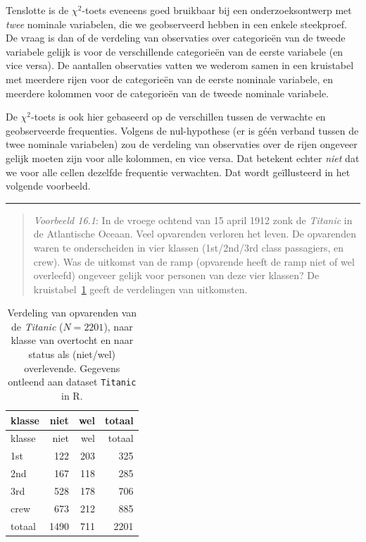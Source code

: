 \documentclass[
]{book}
\begin{document}
Tenslotte is de \(\chi^2\)-toets eveneens goed bruikbaar bij een onderzoeksontwerp met
\emph{twee} nominale variabelen, die we geobserveerd hebben in een enkele
steekproef. De vraag is dan of de verdeling van observaties over
categorieën van de tweede variabele gelijk is voor de verschillende
categorieën van de eerste variabele (en vice versa). De aantallen
observaties vatten we wederom samen in een kruistabel met meerdere rijen
voor de categorieën van de eerste nominale variabele, en meerdere
kolommen voor de categorieën van de tweede nominale variabele.

De \(\chi^2\)-toets is ook hier gebaseerd op de verschillen tussen de verwachte en
geobserveerde frequenties. Volgens de nul-hypothese (er is géén verband
tussen de twee nominale variabelen) zou de verdeling van observaties
over de rijen ongeveer gelijk moeten zijn voor alle kolommen, en vice
versa. Dat betekent echter \emph{niet} dat we voor alle cellen dezelfde
frequentie verwachten. Dat wordt geïllusteerd in het volgende voorbeeld.

\begin{center}\rule{0.5\linewidth}{0.5pt}\end{center}

\begin{quote}
\emph{Voorbeeld 16.1}: In de vroege ochtend
van 15 april 1912 zonk de \emph{Titanic} in de Atlantische Oceaan. Veel
opvarenden verloren het leven. De opvarenden waren te onderscheiden in
vier klassen (1st/2nd/3rd class passagiers, en crew). Was de uitkomst
van de ramp (opvarende heeft de ramp niet of wel overleefd) ongeveer gelijk voor personen van
deze vier klassen? De kruistabel~\ref{tab:titanic} geeft de verdelingen van uitkomsten.
\end{quote}

\begin{longtable}[]{@{}lrrr@{}}
\caption{\label{tab:titanic} Verdeling van opvarenden van de \emph{Titanic} (\(N=2201\)), naar klasse van overtocht en naar status als (niet/wel) overlevende. Gegevens ontleend aan dataset \texttt{Titanic} in R.}\tabularnewline
\toprule\noalign{}
klasse & niet & wel & totaal \\
\midrule\noalign{}
\endfirsthead
\toprule\noalign{}
klasse & niet & wel & totaal \\
\midrule\noalign{}
\endhead
\bottomrule\noalign{}
\endlastfoot
1st & 122 & 203 & 325 \\
2nd & 167 & 118 & 285 \\
3rd & 528 & 178 & 706 \\
crew & 673 & 212 & 885 \\
totaal & 1490 & 711 & 2201 \\
\end{longtable}
\end{document}
